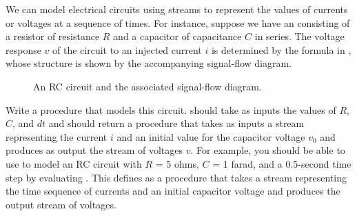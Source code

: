 \begin{exercise}
	\label{Exercise 3.73}
	We can model electrical circuits using streams to represent the values of currents or voltages at a sequence of times.
	For instance, suppose we have an  consisting of a resistor of resistance \( R \) and a capacitor of capacitance \( C \) in series.
	The voltage response \( v \) of the circuit to an injected current \( i \) is determined by the formula in , whose structure is shown by the accompanying signal-flow diagram.

	\begin{figure}[tb]
		\centering
		
		\caption{
			An RC circuit and the associated signal-flow diagram.
		}
		\label{Figure 3.33}
	\end{figure}

	Write a procedure  that models this circuit.
	 should take as inputs the values of \( R \), \( C \), and \( dt \) and should return a procedure that takes as inputs a stream representing the current \( i \) and an initial value for the capacitor voltage \( v_0 \) and produces as output the stream of voltages \( v \).
	For example, you should be able to use  to model an RC circuit with \( R \) = 5 ohms, \( C \) = 1 farad, and a 0.5-second time step by evaluating .
	This defines  as a procedure that takes a stream representing the time sequence of currents and an initial capacitor voltage and produces the output stream of voltages.
\end{exercise}



